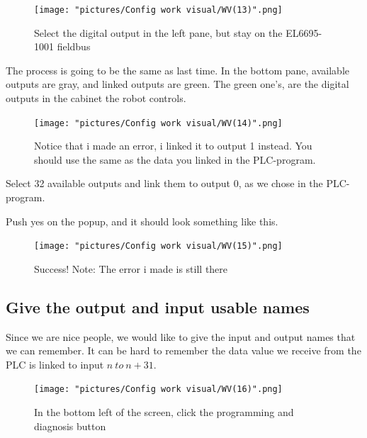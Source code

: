 \documentclass{article}
\begin{document}
\begin{figure}[!h]
    \centering
    \texttt{[image: "pictures/Config work visual/WV(13)".png]}
    \caption{Select the digital output in the left pane, but stay on the EL6695-1001 fieldbus }
    \label{fig:my_label}
\end{figure}

\newpage

The process is going to be the same as last time. In the bottom pane, available outputs are gray, and linked outputs are green. The green one's, are the digital outputs in the cabinet the robot controls. 

\begin{figure}[!h]
    \centering
    \texttt{[image: "pictures/Config work visual/WV(14)".png]}
    \caption{Notice that i made an error, i linked it to output 1 instead. You should use the same as the data you linked in the PLC-program.  }
    \label{fig:my_label}
\end{figure}

Select 32 available outputs and link them to output 0, as we chose in the PLC-program.

\newpage

Push yes on the popup, and it should look something like this.

\begin{figure}[!h]
    \centering
    \texttt{[image: "pictures/Config work visual/WV(15)".png]}
    \caption{Success! Note: The error i made is still there}
    \label{fig:my_label}
\end{figure}

\newpage

\subsection{Give the output and input usable names}
Since we are nice people, we would like to give the input and output names that we can remember. It can be hard to remember the data value we receive from the PLC is linked to input $n\:to\:n+31$. 

\newline
\newline

\begin{figure}[!h]
    \centering
    \texttt{[image: "pictures/Config work visual/WV(16)".png]}
    \caption{In the bottom left of the screen, click the programming and diagnosis button}
    \label{fig:my_label}
\end{figure}
\end{document}

